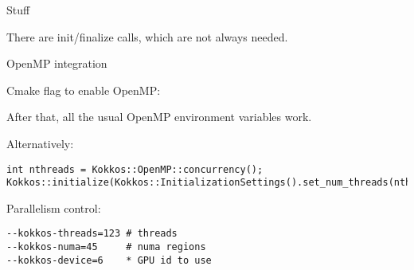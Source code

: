  {Stuff}

There are init/finalize calls, which are not always needed.

 {OpenMP integration}

Cmake flag to enable OpenMP: 

After that, all the usual OpenMP environment variables work.

Alternatively:
\begin{lstlisting}
int nthreads = Kokkos::OpenMP::concurrency();
Kokkos::initialize(Kokkos::InitializationSettings().set_num_threads(nthreads))
\end{lstlisting}


Parallelism control:
\begin{verbatim}
--kokkos-threads=123 # threads
--kokkos-numa=45     # numa regions
--kokkos-device=6    * GPU id to use
\end{verbatim}


